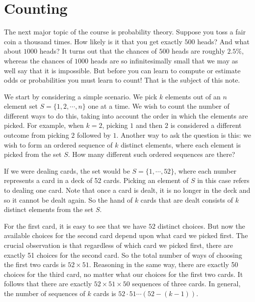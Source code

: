\documentclass[11pt,fleqn]{article}
\begin{document}
\maketitle


\section*{Counting}

The next major topic of the course is probability theory.  Suppose you toss a fair coin a thousand 
times.  How likely is it that you get exactly $500$ heads? 
And what about $1000$ heads? It turns out that the chances of 
$500$ heads are roughly $2.5\%$, whereas the chances of $1000$
heads are so infinitesimally small that we may as well say 
that it is impossible. But before you can learn to compute or
estimate odds or probabilities you must learn to count! That is 
the subject of this note.

We start by considering a simple scenario. We pick $k$ elements out of 
an $n$ element set $S = \{1,2,\cdots,n\}$ one at a 
time. We wish to count the number of different ways to do this, taking into account the order
in which the elements are picked. For example, when
$k = 2$, picking $1$ and then $2$ is considered a different outcome from picking
$2$ followed by $1$. 
Another way to ask the question
is this: we wish to form an ordered sequence of $k$ distinct elements, where
each element is picked from the set $S$. How many different such ordered sequences
are there?

If we were dealing cards, the set would be $S = \{1,\cdots,52\}$, where
each number represents a card in a deck of 52 cards. Picking an element of $S$ in this case
refers to dealing one card. Note that once a card is dealt, it is no longer in the deck and so it
cannot be dealt again. So the hand of $k$ cards that are dealt consists of $k$ distinct elements
from the set $S$.

For the first card, it is easy to see that we have $52$
distinct choices. But now the available choices for the second card depend upon what card we picked first. 
The crucial observation is that regardless of which card we picked first, there are exactly 51 choices for 
the second card. So the total number of ways of choosing the first two cards is $52 \times 51$. Reasoning
in the same way, there are exactly 50 choices for the third card, no matter what our choices for the first
two cards. It follows that there are exactly $52 \times 51 \times 50$ sequences of three cards. In general, 
the number of sequences of $k$ cards is $52\cdot 51\cdots (52 - (k - 1))$.
\end{document}
